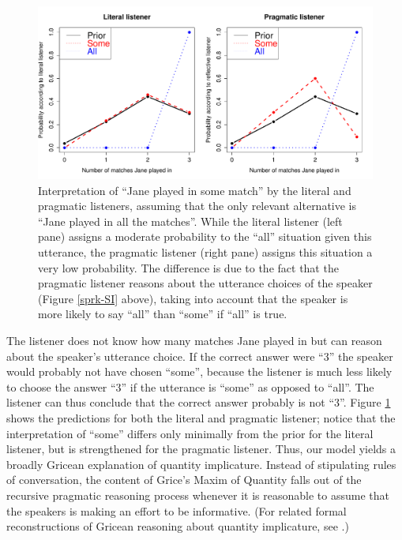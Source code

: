 \documentclass[pdfextras]{handbook}
\begin{document}
\begin{figure}[tbh]
\begin{center}
\includegraphics[scale=.4]{listeners.pdf}
\end{center}
\caption{Interpretation of ``Jane played in some match'' by the literal and pragmatic listeners, assuming that the only relevant alternative is ``Jane played in all the matches''. While the literal listener (left pane) assigns a moderate probability to the ``all'' situation given this utterance, the pragmatic listener (right pane) assigns this situation a very low probability. The difference is due to the fact that the pragmatic listener reasons about the utterance choices of the speaker (Figure \ref{sprk-SI} above), taking into account that the speaker is more likely to say ``all'' than ``some'' if ``all'' is true.}
\label{listener-SI}
\end{figure}

The listener does not know how many matches Jane played in but can reason about the speaker's utterance choice. If the correct answer were ``3'' the speaker would probably not have chosen ``some'', because the listener is much less likely to choose the answer ``3'' if the utterance is ``some'' as opposed to ``all''. The listener can thus conclude that the correct answer probably is not ``3''.
Figure \ref{listener-SI} shows the predictions for both the literal and pragmatic listener; notice that the interpretation of ``some'' differs only minimally from the prior for the literal listener, but is strengthened for the pragmatic listener.
Thus, our model yields a broadly Gricean explanation of quantity implicature. Instead of stipulating rules of conversation, the content of Grice's Maxim of Quantity falls out of the recursive pragmatic reasoning process whenever it is reasonable to assume that the speakers is making an effort to be informative. (For related formal reconstructions of Gricean reasoning about quantity implicature, see \citet{franke09,Vogel-etal:2013}.)
 
\end{document}
